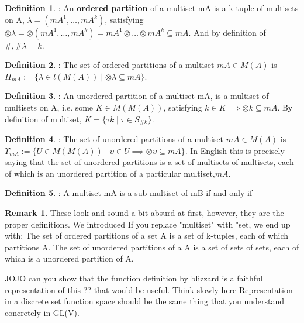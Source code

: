 \documentclass{article}
\theoremstyle{definition}
\newtheorem{definition}{Definition}
\newtheorem*{remark}{Remark}
\begin{document}
\begin{definition}: An \textbf{ordered partition} of a multiset mA is a k-tuple of multisets on A, $\lambda=(mA^1,\dots,mA^k)$, satisfying $\otimes\lambda=\otimes(mA^1,\dots,mA^k)=mA^1\otimes\dots\otimes mA^k \subseteq mA$. And by definition of $\#, \#\lambda=k$. \end{definition}
\begin{definition}: The set of ordered partitions of a multiset $mA\in M(A)$ is $\Pi_{mA}:=\{\lambda \in l(M(A)) \mid \otimes\lambda \subseteq mA\}$. \end{definition}
\begin{definition}: An unordered partition of a multiset mA, is a multiset of multisets on A, i.e. some $K \in M(M(A))$, satisfying $k\in K \implies \otimes k \subseteq mA$. By definition of multiset, $K=\{ \tau k \mid \tau \in S_{\#k}\}$.\end{definition}
\begin{definition}: The set of unordered partitions of a multiset $mA \in M(A)$ is $\Upsilon_{mA} := \{ U \in M(M(A)) \mid \upsilon \in U \implies \otimes\upsilon \subseteq mA \}$.  In English this is precisely saying that the set of unordered partitions is a set of multisets of multisets, each of which is an unordered partition of a particular multiset,$mA$.\end{definition}

\begin{definition}: A multiset mA is a sub-multiset of mB if and only if 
\end{definition}


\begin{remark} These look and sound a bit absurd at first, however, they are the proper definitions. We introduced If you replace "multiset" with "set, we end up with:
The set of ordered partitions of a set A is a set of k-tuples, each of which partitions A.
The set of unordered partitions of a A is a set of sets of sets, each of which is a unordered partition of A.
\end{remark}

JOJO can you show that the function definition by blizzard is a faithful representation of this ?? that would be useful. Think slowly here Representation in a discrete set function space should be the same thing that you understand concretely in GL(V).
\end{document}
